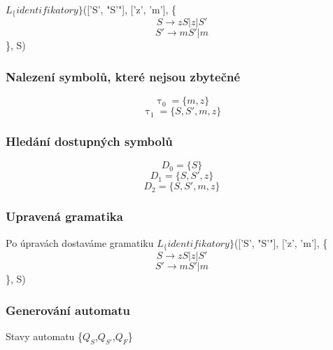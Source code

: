 $L_\{identifikatory\}$(['S', "S'"], ['z', 'm'], \{
$$S \rightarrow zS|z|S'$$$$S' \rightarrow mS'|m$$\},
S)

\subsubsection{Nalezení symbolů, které nejsou zbytečné}$$\uptau_0 = \{m,z\}$$$$\uptau_1 = \{S,S',m,z\}$$\subsubsection{Hledání dostupných symbolů}$$D_0 = \{S\}$$$$D_1 = \{S,S',z\}$$$$D_2 = \{S,S',m,z\}$$\subsubsection{Upravená gramatika}
Po úpravách dostaváme gramatiku
$L_\{identifikatory\}$(['S', "S'"], ['z', 'm'], \{
$$S \rightarrow zS|z|S'$$$$S' \rightarrow mS'|m$$\},
S)

\subsubsection{Generování automatu}
Stavy automatu \{$Q_{S}$,$Q_{S'}$,$Q_{F}$\}
